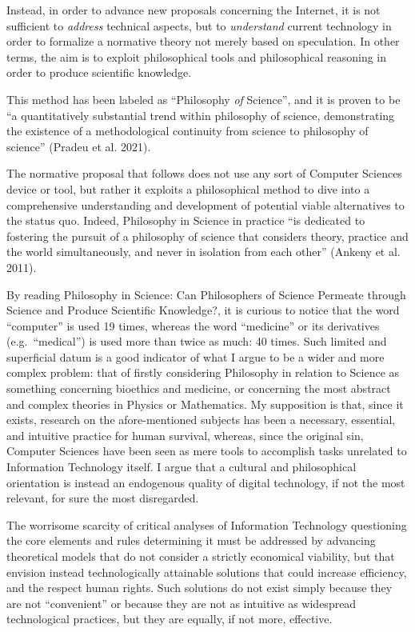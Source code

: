 \documentclass[
  a4paper,
]{book}
\begin{document}
Instead, in order to advance new proposals concerning the Internet, it is not sufficient to \emph{address} technical aspects, but to \emph{understand} current technology in order to formalize a normative theory not merely based on speculation. In other terms, the aim is to exploit philosophical tools and philosophical reasoning in order to produce scientific knowledge.

This method has been labeled as ``Philosophy \emph{of} Science'', and it is proven to be ``a quantitatively substantial trend within philosophy of science, demonstrating the existence of a methodological continuity from science to philosophy of science'' {(Pradeu et al. 2021)}.

The normative proposal that follows does not use any sort of Computer Sciences device or tool, but rather it exploits a philosophical method to dive into a comprehensive understanding and development of potential viable alternatives to the status quo. Indeed, Philosophy in Science in practice ``is dedicated to fostering the pursuit of a philosophy of science that considers theory, practice and the world simultaneously, and never in isolation from each other'' {(Ankeny et al. 2011)}.

By reading Philosophy in Science: Can Philosophers of Science Permeate through Science and Produce Scientific Knowledge?, it is curious to notice that the word ``computer'' is used 19 times, whereas the word ``medicine'' or its derivatives (e.g.~``medical'') is used more than twice as much: 40 times. Such limited and superficial datum is a good indicator of what I argue to be a wider and more complex problem: that of firstly considering Philosophy in relation to Science as something concerning bioethics and medicine, or concerning the most abstract and complex theories in Physics or Mathematics. My supposition is that, since it exists, research on the afore-mentioned subjects has been a necessary, essential, and intuitive practice for human survival, whereas, since the original sin, Computer Sciences have been seen as mere tools to accomplish tasks unrelated to Information Technology itself. I argue that a cultural and philosophical orientation is instead an endogenous quality of digital technology, if not the most relevant, for sure the most disregarded.

The worrisome scarcity of critical analyses of Information Technology questioning the core elements and rules determining it must be addressed by advancing theoretical models that do not consider a strictly economical viability, but that envision instead technologically attainable solutions that could increase efficiency, and the respect human rights. Such solutions do not exist simply because they are not ``convenient'' or because they are not as intuitive as widespread technological practices, but they are equally, if not more, effective.
\end{document}
